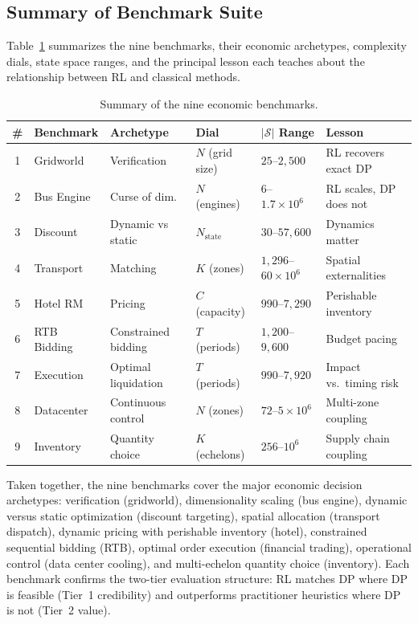 \subsection{Summary of Benchmark Suite}
\label{sec:benchmark_summary}

Table~\ref{tab:benchmark_summary} summarizes the nine benchmarks, their economic archetypes, complexity dials, state space ranges, and the principal lesson each teaches about the relationship between RL and classical methods.

\begin{table}[htbp]
\centering
\caption{Summary of the nine economic benchmarks.}
\label{tab:benchmark_summary}
\begin{tabular}{clllll}
\toprule
\# & Benchmark & Archetype & Dial & $|\mathcal{S}|$ Range & Lesson \\
\midrule
1 & Gridworld & Verification & $N$ (grid size) & $25$--$2{,}500$ & RL recovers exact DP \\
2 & Bus Engine & Curse of dim. & $N$ (engines) & $6$--$1.7 \times 10^6$ & RL scales, DP does not \\
3 & Discount & Dynamic vs static & $N_{\mathrm{state}}$ & $30$--$57{,}600$ & Dynamics matter \\
4 & Transport & Matching & $K$ (zones) & $1{,}296$--$60 \times 10^6$ & Spatial externalities \\
5 & Hotel RM & Pricing & $C$ (capacity) & $990$--$7{,}290$ & Perishable inventory \\
6 & RTB Bidding & Constrained bidding & $T$ (periods) & $1{,}200$--$9{,}600$ & Budget pacing \\
7 & Execution & Optimal liquidation & $T$ (periods) & $990$--$7{,}920$ & Impact vs.\ timing risk \\
8 & Datacenter & Continuous control & $N$ (zones) & $72$--$5 \times 10^6$ & Multi-zone coupling \\
9 & Inventory & Quantity choice & $K$ (echelons) & $256$--$10^6$ & Supply chain coupling \\
\bottomrule
\end{tabular}
\end{table}

Taken together, the nine benchmarks cover the major economic decision archetypes: verification (gridworld), dimensionality scaling (bus engine), dynamic versus static optimization (discount targeting), spatial allocation (transport dispatch), dynamic pricing with perishable inventory (hotel), constrained sequential bidding (RTB), optimal order execution (financial trading), operational control (data center cooling), and multi-echelon quantity choice (inventory). Each benchmark confirms the two-tier evaluation structure: RL matches DP where DP is feasible (Tier~1 credibility) and outperforms practitioner heuristics where DP is not (Tier~2 value).

